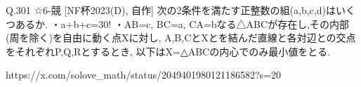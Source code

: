 Q.301 ☆6-競 [NF杯2023(D), 自作]
次の2条件を満たす正整数の組(a,b,c,d)はいくつあるか.
・a+b+c=30!
・AB=c, BC=a, CA=bなる△ABCが存在し,その内部(周を除く)を自由に動く点Xに対し, A,B,CとXとを結んだ直線と各対辺との交点をそれぞれP,Q,Rとするとき, 以下はX=△ABCの内心でのみ最小値をとる.



https://x.com/solove_math/status/2049401980121186582?s=20
